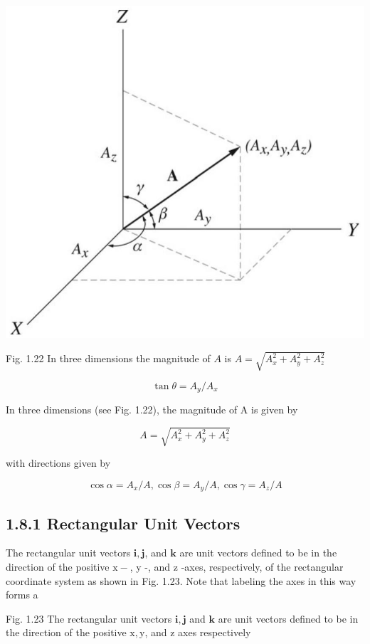 \documentclass[10pt]{article}
\begin{document}
\begin{center}
\includegraphics[max width=\textwidth]{2024_09_13_db1f357d2aad0a03eb2eg-018}
\end{center}

Fig. 1.22 In three dimensions the magnitude of $A$ is $A=\sqrt{A_{x}^{2}+A_{y}^{2}+A_{z}^{2}}$

$$
\tan \theta=A_{y} / A_{x}
$$

In three dimensions (see Fig. 1.22), the magnitude of A is given by

$$
A=\sqrt{A_{x}^{2}+A_{y}^{2}+A_{z}^{2}}
$$

with directions given by

$$
\cos \alpha=A_{x} / A, \cos \beta=A_{y} / A, \cos \gamma=A_{z} / A
$$

\subsection*{1.8.1 Rectangular Unit Vectors}
The rectangular unit vectors $\mathbf{i}, \mathbf{j}$, and $\mathbf{k}$ are unit vectors defined to be in the direction of the positive $\mathrm{x}-$, y -, and z -axes, respectively, of the rectangular coordinate system as shown in Fig. 1.23. Note that labeling the axes in this way forms a

Fig. 1.23 The rectangular unit vectors $\mathbf{i}, \mathbf{j}$ and $\mathbf{k}$ are unit vectors defined to be in the direction of the positive $\mathrm{x}, \mathrm{y}$, and z axes respectively
\end{document}
